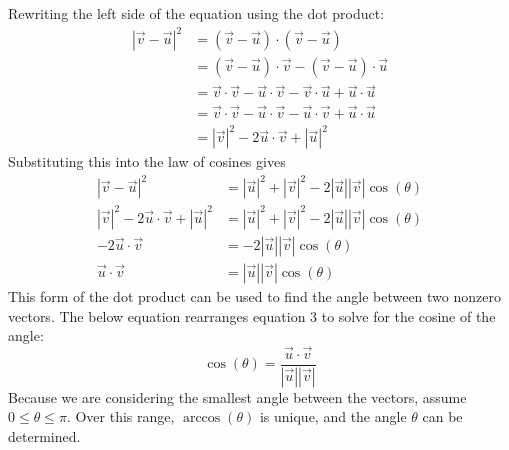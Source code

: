 \documentclass[a4paper]{article}
\begin{document}
Rewriting the left side of the equation using the dot product:
\begin{align*}
    |\vec{v} - \vec{u}|^2 &= (\vec{v} - \vec{u}) \cdot (\vec{v} - \vec{u})\\
    &= (\vec{v} - \vec{u}) \cdot \vec{v} - (\vec{v} - \vec{u}) \cdot \vec{u}\\
    &= \vec{v} \cdot \vec{v} - \vec{u} \cdot \vec{v} - \vec{v} \cdot \vec{u} + \vec{u} \cdot \vec{u}\\
    &= \vec{v} \cdot \vec{v} - \vec{u} \cdot \vec{v} - \vec{u} \cdot \vec{v} + \vec{u} \cdot \vec{u}\\
    &= |\vec{v}|^2 - 2\vec{u} \cdot \vec{v} + |\vec{u}|^2
\end{align*}
Substituting this into the law of cosines gives
\begin{align*}
    |\vec{v} - \vec{u}|^2 &= |\vec{u}|^2 + |\vec{v}|^2 - 2|\vec{u}||\vec{v}|\cos(\theta)\\
    |\vec{v}|^2 - 2\vec{u} \cdot \vec{v} + |\vec{u}|^2 &= |\vec{u}|^2 + |\vec{v}|^2 - 2|\vec{u}||\vec{v}|\cos(\theta)\\
    -2\vec{u} \cdot \vec{v} &= -2|\vec{u}||\vec{v}|\cos(\theta)\\
    \vec{u} \cdot \vec{v} &= |\vec{u}||\vec{v}|\cos(\theta)    
\end{align*}
This form of the dot product can be used to find the angle between two nonzero vectors. The below equation rearranges equation 3 to solve for the cosine of the angle:
\begin{equation}
    \cos(\theta) = \frac{\vec{u} \cdot \vec{v}}{|\vec{u}||\vec{v}|}
\end{equation}
Because we are considering the smallest angle between the vectors, assume $0 \leq \theta \leq \pi$. Over this range, $\arccos(\theta)$ is unique, and the angle $\theta$ can be determined.
\begin{center}
\end{center}
\end{document}
